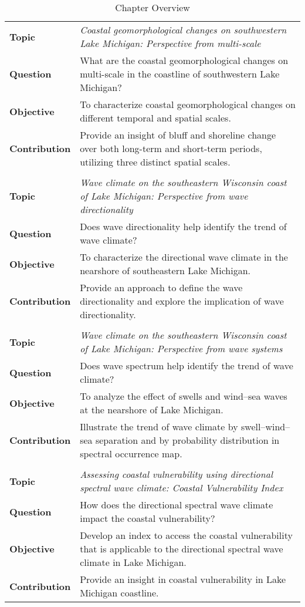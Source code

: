 \renewcommand{\arraystretch}{1.4}

\begin{longtable}{|>{\raggedright\arraybackslash}p{2.4cm}|p{10cm}|}
\caption{Chapter Overview} \\
\hline
\multicolumn{2}{|c|}{\textbf{Chapter 2}} \\
\hline
\textbf{Topic} & \textit{Coastal geomorphological changes on southwestern Lake Michigan: Perspective from multi-scale} \\
\textbf{Question} & What are the coastal geomorphological changes on multi-scale in the coastline of southwestern Lake Michigan? \\
\textbf{Objective} & To characterize coastal geomorphological changes on different temporal and spatial scales. \\
\textbf{Contribution} & Provide an insight of bluff and shoreline change over both long-term and short-term periods, utilizing three distinct spatial scales. \\
\hline
\multicolumn{2}{|c|}{\textbf{Chapter 3}} \\
\hline
\textbf{Topic} & \textit{Wave climate on the southeastern Wisconsin coast of Lake Michigan: Perspective from wave directionality} \\
\textbf{Question} & Does wave directionality help identify the trend of wave climate? \\
\textbf{Objective} & To characterize the directional wave climate in the nearshore of southeastern Lake Michigan. \\
\textbf{Contribution} & Provide an approach to define the wave directionality and explore the implication of wave directionality. \\
\hline
\multicolumn{2}{|c|}{\textbf{Chapter 4}} \\
\hline
\textbf{Topic} & \textit{Wave climate on the southeastern Wisconsin coast of Lake Michigan: Perspective from wave systems} \\
\textbf{Question} & Does wave spectrum help identify the trend of wave climate? \\
\textbf{Objective} & To analyze the effect of swells and wind–sea waves at the nearshore of Lake Michigan. \\
\textbf{Contribution} & Illustrate the trend of wave climate by swell–wind–sea separation and by probability distribution in spectral occurrence map. \\
\hline
\multicolumn{2}{|c|}{\textbf{Chapter 5}} \\
\hline
\textbf{Topic} & \textit{Assessing coastal vulnerability using directional spectral wave climate: Coastal Vulnerability Index} \\
\textbf{Question} & How does the directional spectral wave climate impact the coastal vulnerability? \\
\textbf{Objective} & Develop an index to access the coastal vulnerability that is applicable to the directional spectral wave climate in Lake Michigan. \\
\textbf{Contribution} & Provide an insight in coastal vulnerability in Lake Michigan coastline. \\
\hline
\end{longtable}

